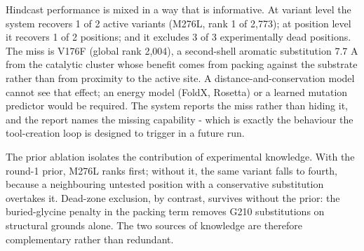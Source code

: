 \begin{table}[htbp]
\centering
\small
\caption{Top of the designed round-2 library. 'Prior' is the round-1 outcome for that position.}
\end{table}

Hindcast performance is mixed in a way that is informative. At variant level the system recovers 1 of 2 active variants (M276L, rank 1 of 2,773); at position level it recovers 1 of 2 positions; and it excludes 3 of 3 experimentally dead positions. The miss is V176F (global rank 2,004), a second-shell aromatic substitution 7.7 A from the catalytic cluster whose benefit comes from packing against the substrate rather than from proximity to the active site. A distance-and-conservation model cannot see that effect; an energy model (FoldX, Rosetta) or a learned mutation predictor would be required. The system reports the miss rather than hiding it, and the report names the missing capability - which is exactly the behaviour the tool-creation loop is designed to trigger in a future run.

The prior ablation isolates the contribution of experimental knowledge. With the round-1 prior, M276L ranks first; without it, the same variant falls to fourth, because a neighbouring untested position with a conservative substitution overtakes it. Dead-zone exclusion, by contrast, survives without the prior: the buried-glycine penalty in the packing term removes G210 substitutions on structural grounds alone. The two sources of knowledge are therefore complementary rather than redundant.

